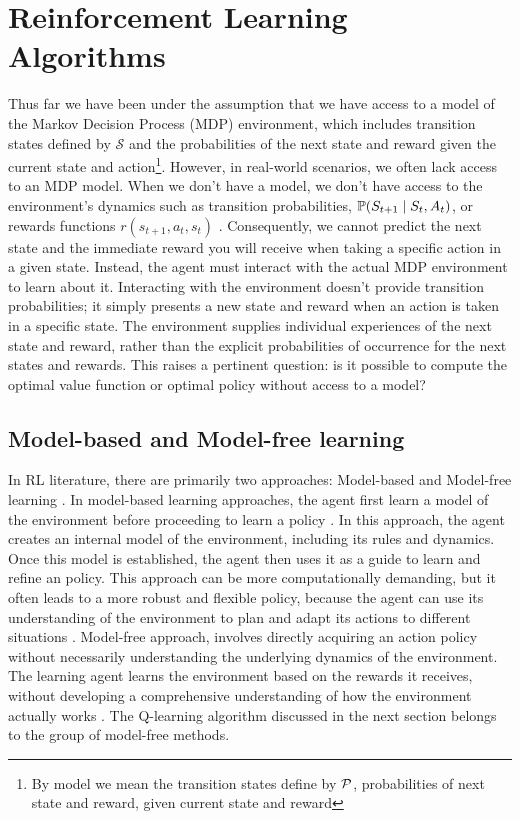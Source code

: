 \section{Reinforcement Learning Algorithms}\label{Algo}
Thus far we have been under the assumption that we have access to a model of the Markov Decision Process (MDP) environment, which includes transition states defined by $\mathcal{S}$ and the probabilities of the next state and reward given the current state and action\footnote{By model we mean the transition states define by $\mathcal P$, probabilities of next state and reward, given current state and reward}.
However, in real-world scenarios, we often lack access to an MDP model. 
When we don't have a model, we don't have access to the environment's dynamics such as transition probabilities, $\mathbb P(S_{t+1} \mid S_t , A_t)$, or rewards functions $r(s_{t+1}, a_t, s_t)$ . Consequently, we cannot predict the next state and the immediate reward you will receive when taking a specific action in a given state. 
Instead, the agent must interact with the actual MDP environment to learn about it. Interacting with the environment doesn't provide transition probabilities; it simply presents a new state and reward when an action is taken in a specific state. The environment supplies individual experiences of the next state and reward, rather than the explicit probabilities of occurrence for the next states and rewards. This raises a pertinent question: is it possible to compute the optimal value function or optimal policy without access to a model?

\subsection{Model-based and Model-free learning}
In RL literature, there are primarily two approaches:  Model-based and Model-free learning \cite{RL3}. In model-based learning approaches, the agent first learn a model of the environment before proceeding to learn a policy \cite{RL2}. In this approach, the agent creates an internal model of the environment, including its rules and dynamics. Once this model is established, the agent then uses it as a guide to learn and refine an  policy. This approach can be more computationally demanding, but it often leads to a more robust and flexible policy, because the agent can use its understanding of the environment to plan and adapt its actions to different situations \cite{RL}.
Model-free approach, involves directly acquiring an action policy without necessarily understanding the underlying dynamics of the environment. The learning agent learns the environment based on the rewards it receives, without developing a comprehensive understanding of how the environment actually works \cite{RL3}. The Q-learning algorithm  discussed in the next section belongs to the group of model-free methods.



